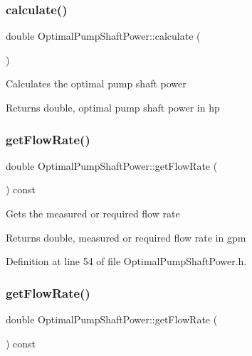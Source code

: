 \subsubsection{\texorpdfstring{calculate()}{calculate()}\hspace{0.1cm}{\footnotesize\ttfamily [3/3]}}
{\footnotesize\ttfamily double Optimal\+Pump\+Shaft\+Power\+::calculate (\begin{DoxyParamCaption}{ }\end{DoxyParamCaption})}

Calculates the optimal pump shaft power

\begin{DoxyReturn}{Returns}
double, optimal pump shaft power in hp 
\end{DoxyReturn}
\mbox{\label{class_optimal_pump_shaft_power_a8c1532459a196347f7d5219d4690a490}} 
\subsubsection{\texorpdfstring{get\+Flow\+Rate()}{getFlowRate()}\hspace{0.1cm}{\footnotesize\ttfamily [1/3]}}
{\footnotesize\ttfamily double Optimal\+Pump\+Shaft\+Power\+::get\+Flow\+Rate (\begin{DoxyParamCaption}{ }\end{DoxyParamCaption}) const\hspace{0.3cm}{\ttfamily [inline]}}

Gets the measured or required flow rate \begin{DoxyReturn}{Returns}
double, measured or required flow rate in gpm 
\end{DoxyReturn}


Definition at line 54 of file Optimal\+Pump\+Shaft\+Power.\+h.

\mbox{\label{class_optimal_pump_shaft_power_a8c1532459a196347f7d5219d4690a490}} 
\subsubsection{\texorpdfstring{get\+Flow\+Rate()}{getFlowRate()}\hspace{0.1cm}{\footnotesize\ttfamily [2/3]}}
{\footnotesize\ttfamily double Optimal\+Pump\+Shaft\+Power\+::get\+Flow\+Rate (\begin{DoxyParamCaption}{ }\end{DoxyParamCaption}) const\hspace{0.3cm}{\ttfamily [inline]}}

